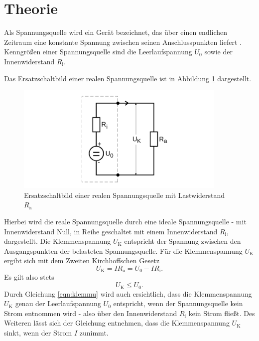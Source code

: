 \section{Theorie}
\label{sec:Theorie}

Als Spannungsquelle wird ein Gerät bezeichnet, das über einen endlichen Zeitraum eine konstante Spannung zwischen seinen Anschlusspunkten liefert \cite{Anleitung}.
Kenngrößen einer Spannungsquelle sind die Leerlaufspannung $U_0$ sowie der Innenwiderstand $R_{\text{i}}$.

Das Ersatzschaltbild einer realen Spannungsquelle ist in Abbildung \ref{fig:abbildung1} dargestellt.
\begin{figure}[H]
  \centering
  \includegraphics[width=0.9\textwidth]{Bilder/Abbildung1.png}
	\caption{Ersatzschaltbild einer realen Spannungsquelle mit Lastwiderstand $R_{\text{a}}$ \cite{Anleitung}}
  \label{fig:abbildung1}
\end{figure}
Hierbei wird die reale Spannungsquelle durch eine ideale Spannungsquelle - mit Innenwiderstand Null, in Reihe geschaltet mit einem Innenwiderstand $R_{\text{i}}$, dargestellt.
Die Klemmenspannung $U_{\text{K}}$ entspricht der Spannung zwischen den Ausgangspunkten der belasteten Spannungsquelle.
Für die Klemmenspannung $U_{\text{K}}$ ergibt sich mit dem Zweiten Kirchhoffschen Gesetz
\begin{equation}
	\label{eqn:klemmu}
	U_{\text{K}} = I R_{\text{a}} = U_0 - I R_{\text{i}} \text{.}
\end{equation}
Es gilt also stets
\begin{equation}
	U_{\text{K}} \le U_0 \text{.}
\end{equation}
Durch Gleichung \eqref{eqn:klemmu} wird auch ersichtlich, dass die Klemmenspannung $U_{\text{K}}$ genau der Leerlaufspannung $U_0$ entspricht, wenn der Spannungsquelle kein Strom entnommen wird - also über den Innenwiderstand $R_{\text{i}}$ kein Strom fließt. Des Weiteren lässt sich der Gleichung entnehmen, dass die Klemmenspannung $U_{\text{K}}$ sinkt, wenn der Strom $I$ zunimmt.

